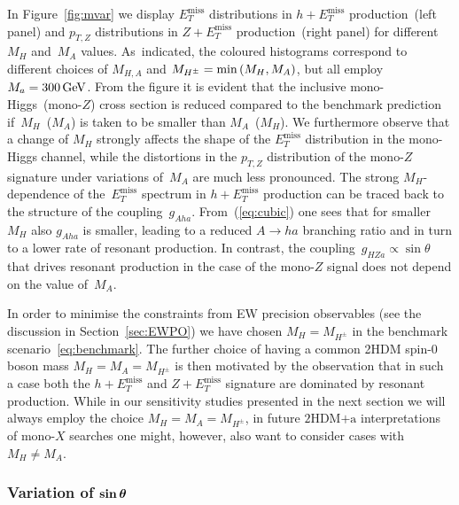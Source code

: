 \documentclass[a4paper, 11pt,notoc]{article}
\newcommand{\MET}{\ensuremath{E_T^\mathrm{miss}}\xspace}
\newcommand{\mA}{\ensuremath{M_{A}}\xspace}
\newcommand{\mH}{\ensuremath{M_{H}}\xspace}
\newcommand{\mHc}{\ensuremath{M_{H^{\pm}}}\xspace}
\newcommand{\hdma}{\ensuremath{\textrm{2HDM+a}}\xspace}
\def\bm#1{\mbox{\boldmath$#1$\unboldmath}}
\begin{document}
In Figure~\ref{fig:mvar} we display $\MET$ distributions in $h + \MET$ production~(left panel) and $p_{T,Z}$ distributions in $Z+\MET$ production~(right panel) for different~$\mH$ and~$\mA$ values. As~indicated, the coloured histograms correspond to  different choices of $M_{H,A}$ and $\mHc = {\rm min} \left ( \mH, \mA \right )$, but all employ $M_a = 300 \, {\rm GeV}$. From the figure it is evident that the inclusive mono-Higgs~(mono-$Z$) cross section is reduced compared to the benchmark prediction if~$\mH$~($\mA$) is taken to be smaller than $\mA$~($\mH$).  We furthermore observe that  a change of $\mH$ strongly affects the shape of the $\MET$ distribution in the mono-Higgs channel, while the distortions in the $p_{T,Z}$ distribution of the mono-$Z$ signature under variations of~$\mA$ are much less pronounced. The strong $M_H$-dependence of the~$\MET$ spectrum in $h + \MET$ production can be traced back to the structure of the coupling~$g_{Aha}$. From~(\ref{eq:cubic}) one sees that for smaller~$M_H$ also $g_{Aha}$ is smaller, leading to a reduced $A \to ha$ branching ratio  and in turn to a lower rate of resonant production.  In contrast, the coupling~$g_{HZa} \propto \sin \theta$ that drives resonant production in the case of the mono-$Z$ signal does not depend on the value of~$M_A$.

In order to minimise the constraints from EW precision observables (see the discussion in Section~\ref{sec:EWPO}) we have chosen $\mH = \mHc$ in the  benchmark scenario~\eqref{eq:benchmark}. The further choice of having a common 2HDM  spin-0 boson  mass $\mH = \mA = \mHc$ is then motivated by the observation that in such a case  both the $h + \MET$ and $Z + \MET$ signature are dominated by resonant production. While in our sensitivity studies presented in the next section we will always employ the choice $\mH = \mA = \mHc$, in future \hdma  interpretations of mono-$X$ searches one might, however,  also want to consider cases with~$\mH \neq \mA$. 

\subsubsection[Variation of $\sin \theta$]{Variation of $\bm{\sin \theta}$}
\end{document}
